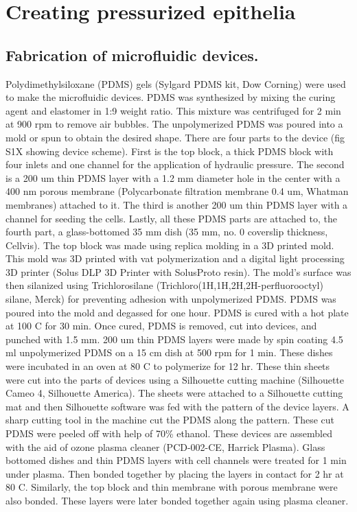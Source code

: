 \hypertarget{creating-pressurized-epithelia}{%
	\section{Creating pressurized
		epithelia}\label{creating-pressurized-epithelia}}

\hypertarget{fabrication-of-microfluidic-devices.}{%
	\subsection{Fabrication of microfluidic
		devices.}\label{fabrication-of-microfluidic-devices.}}

Polydimethylsiloxane (PDMS) gels (Sylgard PDMS kit, Dow Corning) were
used to make the microfluidic devices. PDMS was synthesized by mixing
the curing agent and elastomer in 1:9 weight ratio. This mixture was
centrifuged for 2 min at 900 rpm to remove air bubbles. The
unpolymerized PDMS was poured into a mold or spun to obtain the desired
shape. There are four parts to the device (fig S1X showing device
scheme). First is the top block, a thick PDMS block with four inlets and
one channel for the application of hydraulic pressure. The second is a
200 um thin PDMS layer with a 1.2 mm diameter hole in the center with a
400 nm porous membrane (Polycarbonate filtration membrane 0.4 um,
Whatman membranes) attached to it. The third is another 200 um thin PDMS
layer with a channel for seeding the cells. Lastly, all these PDMS parts
are attached to, the fourth part, a glass-bottomed 35 mm dish (35 mm,
no. 0 coverslip thickness, Cellvis). The top block was made using
replica molding in a 3D printed mold. This mold was 3D printed with vat
polymerization and a digital light processing 3D printer (Solus DLP 3D
Printer with SolusProto resin). The mold's surface was then silanized
using Trichlorosilane (Trichloro(1H,1H,2H,2H-perfluorooctyl) silane,
Merck) for preventing adhesion with unpolymerized PDMS. PDMS was poured
into the mold and degassed for one hour. PDMS is cured with a hot plate
at 100 C for 30 min. Once cured, PDMS is removed, cut into devices, and
punched with 1.5 mm. 200 um thin PDMS layers were made by spin coating
4.5 ml unpolymerized PDMS on a 15 cm dish at 500 rpm for 1 min. These
dishes were incubated in an oven at 80 C to polymerize for 12 hr. These
thin sheets were cut into the parts of devices using a Silhouette
cutting machine (Silhouette Cameo 4, Silhouette America). The sheets
were attached to a Silhouette cutting mat and then Silhouette software
was fed with the pattern of the device layers. A sharp cutting tool in
the machine cut the PDMS along the pattern. These cut PDMS were peeled
off with help of 70\% ethanol. These devices are assembled with the aid
of ozone plasma cleaner (PCD-002-CE, Harrick Plasma). Glass bottomed
dishes and thin PDMS layers with cell channels were treated for 1 min
under plasma. Then bonded together by placing the layers in contact for
2 hr at 80 C. Similarly, the top block and thin membrane with porous
membrane were also bonded. These layers were later bonded together again
using plasma cleaner.

